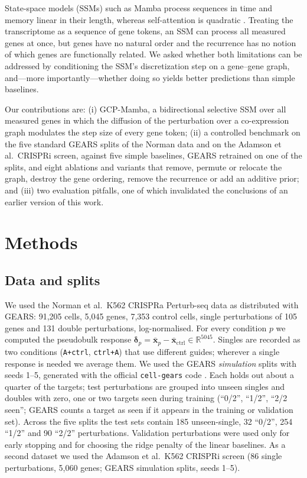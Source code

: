 \documentclass{bioinfo}
\begin{document}
State-space models (SSMs) such as Mamba \citep{gu2023} process sequences in time and memory linear
in their length, whereas self-attention is quadratic \citep{vaswani2017}. Treating the transcriptome
as a sequence of gene tokens, an SSM can process all measured genes at once, but genes have no
natural order and the recurrence has no notion of which genes are functionally related. We asked
whether both limitations can be addressed by conditioning the SSM's discretization step on a
gene--gene graph, and---more importantly---whether doing so yields better predictions than simple
baselines.

Our contributions are: (i) GCP-Mamba, a bidirectional selective SSM over all measured genes in which
the diffusion of the perturbation over a co-expression graph modulates the step size of every gene
token; (ii) a controlled benchmark on the five standard GEARS splits of the Norman data and on the
Adamson et al.\ CRISPRi screen, against five simple baselines, GEARS retrained on one of the splits,
and eight ablations and variants that remove, permute or relocate the graph, destroy the gene
ordering, remove the recurrence or add an additive prior; and (iii) two evaluation pitfalls, one of
which invalidated the conclusions of an earlier version of this work.

\section{Methods}

\subsection{Data and splits}
We used the Norman et al.\ K562 CRISPRa Perturb-seq data \citep{norman2019} as distributed with
GEARS: 91{,}205 cells, 5{,}045 genes, 7{,}353 control cells, single perturbations of 105 genes and
131 double perturbations, log-normalised. For every condition $p$ we computed the pseudobulk
response $\bm{\delta}_p=\bar{\mathbf{x}}_p-\bar{\mathbf{x}}_{\mathrm{ctrl}}\in\mathbb{R}^{5045}$.
Singles are recorded as two conditions (\texttt{A+ctrl}, \texttt{ctrl+A}) that use different guides;
wherever a single response is needed we average them. We used the GEARS \emph{simulation} splits
with seeds 1--5, generated with the official \texttt{cell-gears} code \citep{roohani2024}. Each holds
out about a quarter of the targets; test perturbations are grouped into unseen singles and doubles
with zero, one or two targets seen during training (``0/2'', ``1/2'', ``2/2 seen''; GEARS counts a
target as seen if it appears in the training or validation set). Across the five splits the test
sets contain 185 unseen-single, 32 ``0/2'', 254 ``1/2'' and 90 ``2/2'' perturbations.
Validation perturbations were used only for early stopping and for choosing the ridge penalty of
the linear baselines. As a second dataset we used the Adamson et al.\ K562 CRISPRi screen
\citep{adamson2016} (86 single perturbations, 5{,}060 genes; GEARS simulation splits, seeds 1--5).
\end{document}
